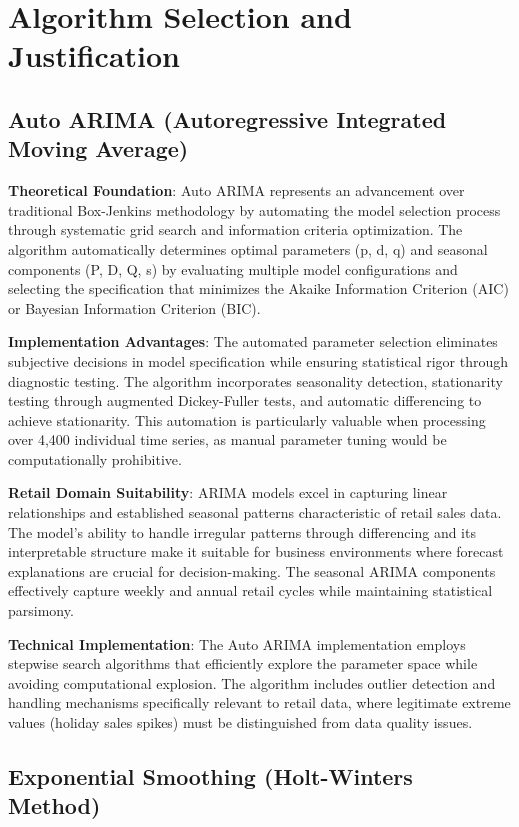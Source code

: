 \section{Algorithm Selection and Justification}

\subsection{Auto ARIMA (Autoregressive Integrated Moving Average)}

\textbf{Theoretical Foundation}: Auto ARIMA represents an advancement over traditional Box-Jenkins methodology by automating the model selection process through systematic grid search and information criteria optimization. The algorithm automatically determines optimal parameters (p, d, q) and seasonal components (P, D, Q, s) by evaluating multiple model configurations and selecting the specification that minimizes the Akaike Information Criterion (AIC) or Bayesian Information Criterion (BIC).

\textbf{Implementation Advantages}: The automated parameter selection eliminates subjective decisions in model specification while ensuring statistical rigor through diagnostic testing. The algorithm incorporates seasonality detection, stationarity testing through augmented Dickey-Fuller tests, and automatic differencing to achieve stationarity. This automation is particularly valuable when processing over 4,400 individual time series, as manual parameter tuning would be computationally prohibitive.

\textbf{Retail Domain Suitability}: ARIMA models excel in capturing linear relationships and established seasonal patterns characteristic of retail sales data. The model's ability to handle irregular patterns through differencing and its interpretable structure make it suitable for business environments where forecast explanations are crucial for decision-making. The seasonal ARIMA components effectively capture weekly and annual retail cycles while maintaining statistical parsimony.

\textbf{Technical Implementation}: The Auto ARIMA implementation employs stepwise search algorithms that efficiently explore the parameter space while avoiding computational explosion. The algorithm includes outlier detection and handling mechanisms specifically relevant to retail data, where legitimate extreme values (holiday sales spikes) must be distinguished from data quality issues.

\subsection{Exponential Smoothing (Holt-Winters Method)}

